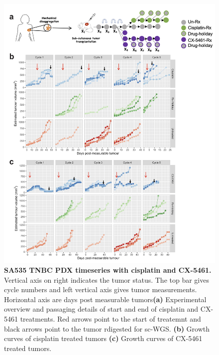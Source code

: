 \begin{figure}
\centering
\includegraphics[width=\textwidth]{Figures/SA535CX5461 .png}
	
\caption[SA535 TNBC PDX timeseries with cisplatin and CX-5461]
	{\small
 \textbf{SA535 TNBC PDX timeseries with cisplatin and CX-5461.}
Vertical axis on right indicates the tumor status. The top bar gives cycle numbers and left vertical axis gives tumor measurements. Horizontal axis are days post measurable tumors\textbf{(a)} Experimental overview and passaging details of start and end of cisplatin and CX-5461 treatments. Red arrows point to the start of treatemnt and black arrows point to the tumor rdigested for sc-WGS.
	   \textbf{(b)} Growth curves of cisplatin treated tumors
	    \textbf{(c)} Growth curves of CX-5461 treated tumors.
	}
	\label{fig:SA535CX5461}
\end{figure}




